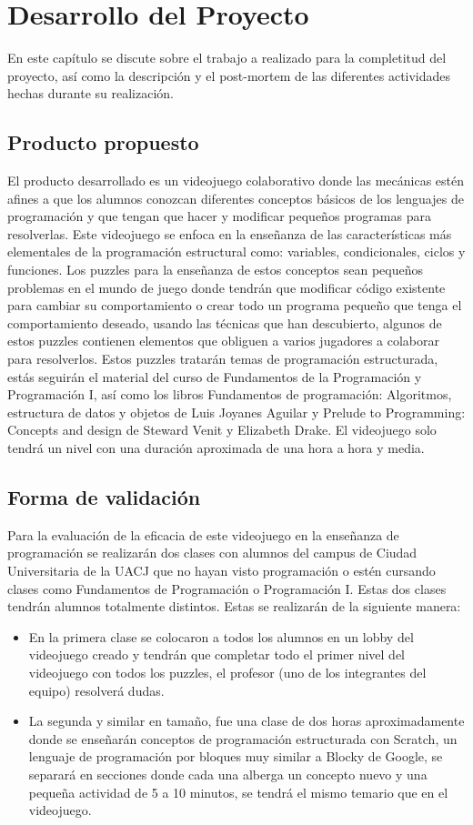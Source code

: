 \chapter{Desarrollo del Proyecto}
En este capítulo se discute sobre el trabajo a realizado para la completitud del proyecto, así como la descripción y el post-mortem de las diferentes actividades hechas durante su realización.

\section{Producto propuesto}
El producto desarrollado es un videojuego colaborativo donde las mecánicas estén afines a que los alumnos conozcan diferentes conceptos básicos de los lenguajes de programación y que tengan que hacer y modificar pequeños programas para resolverlas.  
Este videojuego se enfoca en la enseñanza de las características más elementales de la programación estructural como: variables, condicionales, ciclos y funciones. Los puzzles para la enseñanza de estos conceptos sean pequeños problemas en el mundo de juego donde tendrán que modificar código existente para cambiar su comportamiento o crear todo un programa pequeño que tenga el comportamiento deseado, usando las técnicas que han descubierto, algunos de estos puzzles contienen elementos que obliguen a varios jugadores a colaborar para resolverlos. Estos puzzles tratarán temas de programación estructurada, estás seguirán el material del curso de Fundamentos de la Programación y Programación I, así como los libros Fundamentos de programación: Algoritmos, estructura de datos y objetos de Luis Joyanes Aguilar y Prelude to Programming: Concepts and design de Steward Venit y Elizabeth Drake. 
El videojuego solo tendrá un nivel con una duración aproximada de una hora a hora y media.

\section{Forma de validación}
Para la evaluación de la eficacia de este videojuego en la enseñanza de programación se realizarán dos clases con alumnos del campus de Ciudad Universitaria de la UACJ que no hayan visto programación o estén cursando clases como Fundamentos de Programación o Programación I.
Estas dos clases tendrán alumnos totalmente distintos. Estas se realizarán de la siguiente manera:
\begin{itemize}
    \item En la primera clase se colocaron a todos los alumnos en un lobby del videojuego creado y tendrán que completar todo el primer nivel del videojuego con todos los puzzles, el profesor (uno de los integrantes del equipo) resolverá dudas.
    \item La segunda y similar en tamaño, fue una clase de dos horas aproximadamente donde se enseñarán conceptos de programación estructurada con Scratch, un lenguaje de programación por bloques muy similar a Blocky de Google, se separará en secciones donde cada una alberga un concepto nuevo y una pequeña actividad de 5 a 10 minutos, se tendrá el mismo temario que en el videojuego.
\end{itemize}

